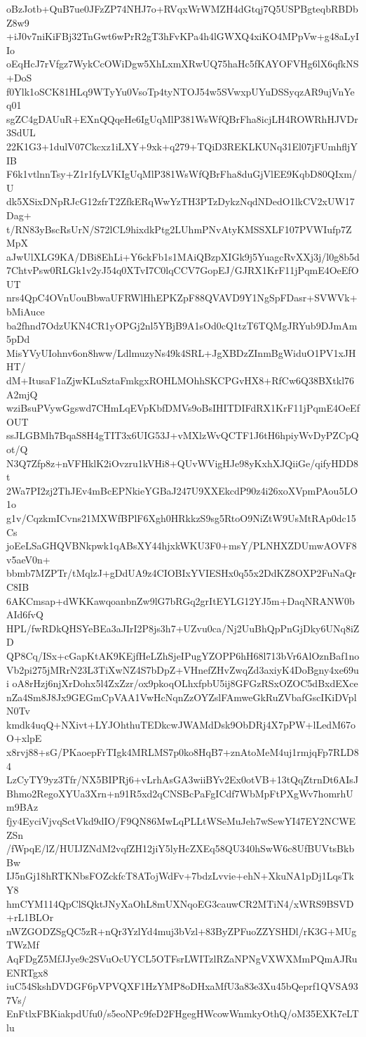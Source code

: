 oBzJotb+QuB7ue0JFzZP74NHJ7o+RVqxWrWMZH4dGtqj7Q5USPBgteqbRBDbZ8w9
+iJ0v7niKiFBj32TnGwt6wPrR2gT3hFvKPa4h4lGWXQ4xiKO4MPpVw+g48aLyIIo
oEqHcJ7rVfgz7WykCcOWiDgw5XhLxmXRwUQ75haHc5fKAYOFVHg6lX6qfkNS+DoS
f0Ylk1oSCK81HLq9WTyYu0VsoTp4tyNTOJ54w5SVwxpUYuDSSyqzAR9ujVnYeq01
sgZC4gDAUuR+EXnQQqeHe6IgUqMlP381WsWfQBrFha8icjLH4ROWRhHJVDr3SdUL
22K1G3+1dulV07Ckcxz1iLXY+9xk+q279+TQiD3REKLKUNq31El07jFUmhfljYIB
F6k1vtlnnTsy+Z1r1fyLVKIgUqMlP381WsWfQBrFha8duGjVlEE9KqbD80QIxm/U
dk5XSixDNpRJcG12zfrT2ZfkERqWwYzTH3PTzDykzNqdNDedO1lkCV2xUW17Dag+
t/RN83yBscRsUrN/S72lCL9hixdkPtg2LUhmPNvAtyKMSSXLF107PVWIufp7ZMpX
aJwUlXLG9KA/DBi8EhLi+Y6ckFb1s1MAiQBzpXIGk9j5YuagcRvXXj3j/l0g8b5d
7ChtvPsw0RLGk1v2yJ54q0XTvI7C0lqCCV7GopEJ/GJRX1KrF11jPqmE4OeEfOUT
nrs4QpC4OVnUouBbwaUFRWlHhEPKZpF88QVAVD9Y1NgSpFDasr+SVWVk+bMiAuce
ba2fhnd7OdzUKN4CR1yOPGj2nl5YBjB9A1sOd0cQ1tzT6TQMgJRYub9DJmAm5pDd
MisYVyUIohnv6on8hww/LdlmuzyNs49k4SRL+JgXBDzZInmBgWiduO1PV1xJHHT/
dM+ItusaF1aZjwKLuSztaFmkgxROHLMOhhSKCPGvHX8+RfCw6Q38BXtkl76A2mjQ
wziBsuPVywGgswd7CHmLqEVpKbfDMVs9oBsIHITDIFdRX1KrF11jPqmE4OeEfOUT
ssJLGBMh7BqaS8H4gTIT3x6UIG53J+vMXlzWvQCTF1J6tH6hpiyWvDyPZCpQot/Q
N3Q7Zfp8z+nVFHklK2iOvzru1kVHi8+QUvWVigHJe98yKxhXJQiiGe/qifyHDD8t
2Wa7PI2zj2ThJEv4mBcEPNkieYGBaJ247U9XXEkcdP90z4i26xoXVpmPAou5LO1o
g1v/CqzkmICvns21MXWfBPlF6Xgh0HRkkzS9sg5RtoO9NiZtW9UsMtRAp0dc15Cs
joEeLSaGHQVBNkpwk1qABsXY44hjxkWKU3F0+msY/PLNHXZDUmwAOVF8v5aeV0n+
bbmb7MZPTr/tMqlzJ+gDdUA9z4CIOBIxYVIESHx0q55x2DdKZ8OXP2FuNaQrC8IB
6AKCmsap+dWKKawqoanbnZw9lG7bRGq2grItEYLG12YJ5m+DaqNRANW0bAId6fvQ
HPL/fwRDkQHSYeBEa3aJIrI2P8js3h7+UZvu0ca/Nj2UuBhQpPnGjDky6UNq8iZD
QP8Cq/ISx+cGapKtAK9KEjfHeLZhSjeIPugYZOPP6hH68l713bVr6AlOznBaf1no
Vb2pi275jMRrN23L3TiXwNZ4S7bDpZ+VHnefZHvZwqZd3axiyK4DoBgny4xe69ui
oA8rHzj6njXrDohx5l4ZxZzr/ox9pkoqOLhxfpbU5ij8GFGzRSxOZOC5dBxdEXce
nZa4Sm8J8Jx9GEGmCpVAA1VwHcNqnZzOYZslFAmweGkRuZVbafGscIKiDVplN0Tv
kmdk4uqQ+NXivt+LYJOhthuTEDkcwJWAMdDsk9ObDRj4X7pPW+lLedM67oO+xlpE
x8rvj88+sG/PKaoepFrTIgk4MRLMS7p0ko8HqB7+znAtoMeM4uj1rmjqFp7RLD84
LzCyTY9yz3Tfr/NX5BIPRj6+vLrhAsGA3wiiBYv2Ex0otVB+13tQqZtrnDt6AIsJ
Bhmo2RegoXYUa3Xrn+n91R5xd2qCNSBcPaFgICdf7WbMpFtPXgWv7homrhUm9BAz
fjy4EyciVjvqSctVkd9dIO/F9QN86MwLqPLLtWSeMuJeh7wSewYI47EY2NCWEZSn
/fWpqE/lZ/HUIJZNdM2vqfZH12jiY5lyHcZXEq58QU340hSwW6c8UfBUVtsBkbBw
IJ5nGj18hRTKNbsFOZckfcT8ATojWdFv+7bdzLvvie+ehN+XkuNA1pDj1LqsTkY8
hmCYM114QpClSQktJNyXaOhL8mUXNqoEG3cauwCR2MTiN4/xWRS9BSVD+rL1BLOr
nWZGODZSgQC5zR+nQr3YzlYd4muj3bVzl+83ByZPFuoZZYSHDl/rK3G+MUgTWzMf
AqFDgZ5MfJJye9c2SVuOcUYCL5OTFsrLWITzlRZaNPNgVXWXMmPQmAJRuENRTgx8
iuC54SkshDVDGF6pVPVQXF1HzYMP8oDHxaMfU3a83e3Xu45bQeprf1QVSA937Vs/
EnFtlxFBKiakpdUfu0/s5eoNPc9feD2FHgegHWcowWnmkyOthQ/oM35EXK7eLTlu
